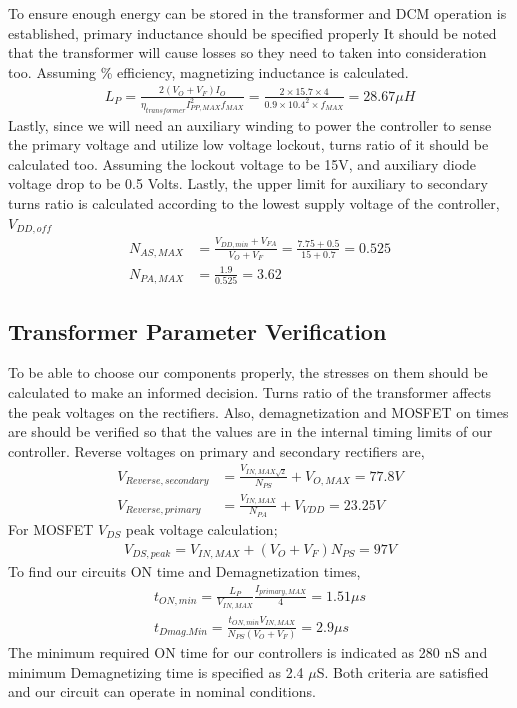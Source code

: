 \par To ensure enough energy can be stored in the transformer and DCM operation is established, primary inductance should be specified properly It should be noted that the transformer will cause losses so they need to taken into consideration too. Assuming \% efficiency, magnetizing inductance is calculated.
\begin{align*}
    L_P=\frac{2(V_O+V_F)I_O}{\eta _{transformer}I_{PP,MAX}^2f_{MAX}}=\frac{2\times 15.7\times 4}{0.9\times 10.4^2\times f_{MAX}}=28.67\mu H
\end{align*}
Lastly, since we will need an auxiliary winding to power the controller to sense the primary voltage and utilize low voltage lockout, turns ratio of it should be calculated too. Assuming the lockout voltage to be 15V, and auxiliary diode voltage drop to be 0.5 Volts. Lastly, the upper limit for auxiliary to secondary turns ratio is calculated according to the lowest supply voltage of the controller, $V_{DD,off}$
\begin{align*}
N_{AS,MAX}&=\frac{V_{DD,min}+V_{FA}}{V_O+V_F}=\frac{7.75+0.5}{15+0.7}=0.525\\
N_{PA,MAX}&=\frac{1.9}{0.525}=3.62
\end{align*}

\subsection{Transformer Parameter Verification}
To be able to choose our components properly, the stresses on them should be calculated to make an informed decision. Turns ratio of the transformer affects the peak voltages on the rectifiers. Also, demagnetization and MOSFET on times are should be verified so that the values are in the internal timing limits of our controller.
Reverse voltages on primary and secondary rectifiers are,
\begin{align*}
V_{Reverse,secondary}&=\frac{V_{IN,MAX\sqrt{2}}}{N_{PS}}+V_{O,MAX}=77.8V\\
V_{Reverse,primary}&=\frac{V_{IN,MAX}}{N_{PA}}+V_{VDD}=23.25V
\end{align*}
For MOSFET $V_{DS}$ peak voltage calculation;
\begin{align*}
    V_{DS,peak}=V_{IN,MAX}+(V_O+V_F)N_{PS}=97V
\end{align*}
To find our circuits ON time and Demagnetization times,
\begin{align*}
t_{ON,min}=\frac{L_P}{V_{IN,MAX}}\frac{I_{primary,MAX}}{4}=1.51\mu s\\
t_{Dmag.Min}=\frac{t_{ON,min}V_{IN,MAX}}{N_{PS}(V_O+V_F)}=2.9\mu s
\end{align*}
The minimum required ON time for our controllers is indicated as 280 nS and minimum Demagnetizing time is specified as 2.4 $\mu$S. Both criteria are satisfied and our circuit can operate in nominal conditions.
